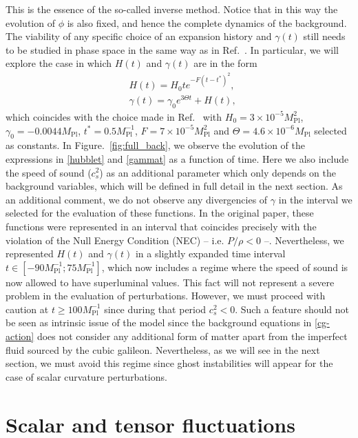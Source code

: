 \documentclass[aps,prd,reprint,twocolumn,showpacs,nofootinbib,superscriptaddress,floatfix]{revtex4-1}
\begin{document}
This is the essence of the so-called inverse method. Notice that in this way the evolution of $\phi$ is also fixed, and hence the complete dynamics of the background. The viability of any specific choice of an expansion history and $\gamma(t)$ still needs to be studied in phase space in the same way as in Ref.~\cite{Easson:2011zy}. In particular, we will explore the case in which $H(t)$ and $\gamma(t)$ are in the form
\begin{eqnarray}
&H(t) = H_0t e^{-F(t-t^*)^2},\label{hubblet}\\
&\gamma(t) = \gamma_0e^{3\Theta t}+H(t),\label{gammat}
\end{eqnarray}
which coincides with the choice made in Ref.~\cite{Ijjas:2016tpn} with $H_0=3\times 10^{-5}M_{\mathrm{Pl}}^2$, $\gamma_0=-0.0044M_{\mathrm{Pl}}$, $t^*=0.5M_{\mathrm{Pl}}^{-1}$, $F=7\times 10^{-5}M_{\mathrm{Pl}}^2$ and $\Theta=4.6\times10^{-6}M_{\mathrm{Pl}}$ selected as constants. In Figure.~\ref{fig:full_back}, we observe the evolution of the expressions in \eqref{hubblet} and \eqref{gammat} as a function of time. Here we also include the speed of sound ($c_s^2$) as an additional parameter which only depends on the background variables, which will be defined in full detail in the next section. As an additional comment, we do not observe any divergencies of $\gamma$ in the interval we selected for the evaluation of these functions. In the original paper, these functions were represented in an interval that coincides precisely with the violation of the Null Energy Condition (NEC) -- i.e. $P/\rho<0$ --. Nevertheless, we represented $H(t)$ and $\gamma(t)$ in a slightly expanded time interval $t\in[-90M_{\mathrm{Pl}}^{-1};75M_{\mathrm{Pl}}^{-1}]$, which now includes a regime where the speed of sound is now allowed to have superluminal values. This fact will not represent a severe problem in the evaluation of perturbations. However, we must proceed with caution at $t\geq 100M_{\mathrm{Pl}}^{-1}$ since during that period $c_s^2<0$. Such a feature should not be seen as intrinsic issue of the model since the background equations in \eqref{cg-action} does not consider any additional form of matter apart from the imperfect fluid sourced by the cubic galileon. Nevertheless, as we will see in the next section, we must avoid this regime since ghost instabilities will appear for the case of scalar curvature perturbations.      

\section{Scalar and tensor fluctuations}\label{secIII}
\end{document}
